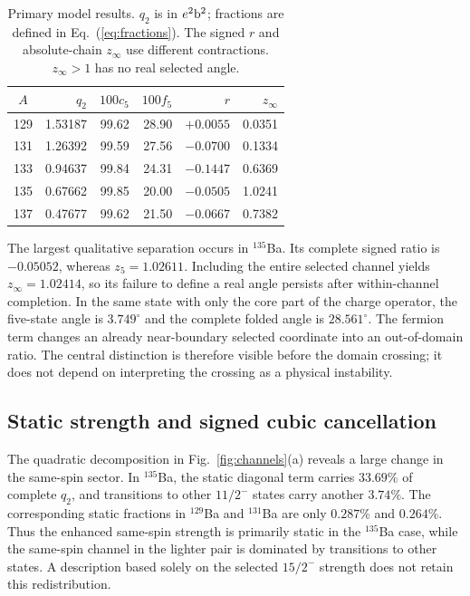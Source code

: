 \documentclass[pdflatex,iicol,sn-mathphys-num]{sn-jnl}
\begin{document}
\begin{table}[t]
\caption{Primary model results. $q_2$ is in $e^2{\rm b}^2$; fractions are defined in Eq.~(\ref{eq:fractions}). The signed $r$ and absolute-chain $z_\infty$ use different contractions. $z_\infty>1$ has no real selected angle.}\label{tab:results}
\centering
\setlength{\tabcolsep}{3pt}
\begin{tabular}{crrrrr}
\toprule
$A$ & $q_2$ & $100c_5$ & $100f_5$ & $r$ & $z_\infty$\\
\midrule
129&1.53187&99.62&28.90&$+0.0055$&0.0351\\
131&1.26392&99.59&27.56&$-0.0700$&0.1334\\
133&0.94637&99.84&24.31&$-0.1447$&0.6369\\
135&0.67662&99.85&20.00&$-0.0505$&1.0241\\
137&0.47677&99.62&21.50&$-0.0667$&0.7382\\
\bottomrule
\end{tabular}
\end{table}

The largest qualitative separation occurs in $^{135}$Ba. Its complete signed ratio is $-0.05052$, whereas $z_5=1.02611$. Including the entire selected channel yields $z_\infty=1.02414$, so its failure to define a real angle persists after within-channel completion. In the same state with only the core part of the charge operator, the five-state angle is $3.749^\circ$ and the complete folded angle is $28.561^\circ$. The fermion term changes an already near-boundary selected coordinate into an out-of-domain ratio. The central distinction is therefore visible before the domain crossing; it does not depend on interpreting the crossing as a physical instability.

\subsection{Static strength and signed cubic cancellation}

The quadratic decomposition in Fig.~\ref{fig:channels}(a) reveals a large change in the same-spin sector. In $^{135}$Ba, the static diagonal term carries $33.69\%$ of complete $q_2$, and transitions to other $11/2^-$ states carry another $3.74\%$. The corresponding static fractions in $^{129}$Ba and $^{131}$Ba are only $0.287\%$ and $0.264\%$. Thus the enhanced same-spin strength is primarily static in the $^{135}$Ba case, while the same-spin channel in the lighter pair is dominated by transitions to other states. A description based solely on the selected $15/2^-$ strength does not retain this redistribution.
\end{document}
